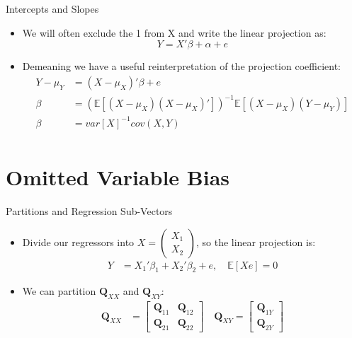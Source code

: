 \documentclass[aspectratio=169, handout, t]{beamer}
\numberwithin{equation}{section}
\begin{document}
\begin{frame}{Intercepts and Slopes}
\begin{itemize}
\item We will often exclude the 1 from X and write the linear projection as:
$$Y=X'\beta+\alpha+e$$
\item Demeaning we have a useful reinterpretation of the projection coefficient:
\begin{align*}
Y-\mu_Y&=(X-\mu_X)'\beta+e\\
\beta&=(\mathbb{E}[(X-\mu_X)(X-\mu_X)'])^{-1}\mathbb{E}[(X-\mu_X)(Y-\mu_Y)]\\
\beta&=var[X]^{-1}cov(X,Y)\\
\end{align*}
\end{itemize}
\end{frame}

\section{Omitted Variable Bias}

\begin{frame}{Partitions and Regression Sub-Vectors}
\begin{itemize}
\item Divide our regressors into $X=\begin{pmatrix} X_1\\ X_2\end{pmatrix}$, so the linear projection is:
\begin{align*}
Y&=X_1'\beta_1+X_2'\beta_2+e, \quad \mathbb{E}[Xe]=0
\end{align*}
\item We can partition $\mathbf{Q}_{XX}$ and $\mathbf{Q}_{XY}$:
\begin{align*}
\mathbf{Q}_{XX}&=\begin{bmatrix} \mathbf{Q}_{11} &\mathbf{Q}_{12}\\\mathbf{Q}_{21}&\mathbf{Q}_{22}\end{bmatrix} \quad
\mathbf{Q}_{XY}=\begin{bmatrix} \mathbf{Q}_{1Y}\\\mathbf{Q}_{2Y}\end{bmatrix}
\end{align*}
\end{itemize}
\end{frame}
\end{document}
